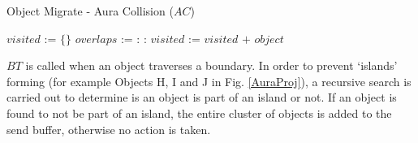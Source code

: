 \begin{algorithm}
	\caption{Object Migrate - Aura Collision ($AC$)}\label{auraAlgorithm}
	\begin{algorithmic}[1]
			
		\State $\textit{visited := \{\}}$
		\State {}
		\EndProcedure
		\State
		\State $\textit{overlaps :=}$  %
		\State
		 :
		:
		\State $\textit{visited := visited + object}$
		\State {}
		\EndIf
		\EndFor
		\State
		\State{}
		\EndProcedure
	\end{algorithmic}
\end{algorithm}

$BT$ is called when an object traverses a boundary. In order to prevent `islands' forming (for example Objects H, I and J in Fig. \ref{AuraProj}), a recursive search is carried out to determine is an object is part of an island or not. If an object is found to not be part of an island, the entire cluster of objects is added to the send buffer, otherwise no action is taken.

